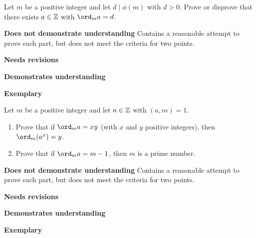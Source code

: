 \documentclass[letterpaper, 11pt]{../ximera}
\begin{document}
\begin{ex}
	Let $m$ be a positive integer and let $d\mid \phi(m)$ with $d>0$. Prove or disprove that there exists $a\in\mathbb Z$ with $\ord_m a=d$.
\end{ex}

\begin{writeRubric}
    \item \textbf{Does not demonstrate understanding}
     Contains a reasonable attempt to prove each part, but does not meet the criteria for two points.
    \item \textbf{Needs revisions}
     
    \item \textbf{Demonstrates understanding}
    
    \item \textbf{Exemplary}
        
\end{writeRubric}
                                       	
\begin{solution}
 
\end{solution}

\begin{ex} Let $m$ be a positive integer and let $a\in\mathbb Z$ with $(a,m)=1$.
	\begin{enumerate}[label=(\alph*)]
 		\item Prove that if $\ord_m a= xy$ (with $x$ and $y$ positive integers), then $\ord_m(a^x)=y$.
		\item Prove that if $\ord_m a =m-1$, then $m$ is a prime number.
	\end{enumerate}
\end{ex}

\begin{writeRubric}
    \item \textbf{Does not demonstrate understanding}
     Contains a reasonable attempt to prove each part, but does not meet the criteria for two points.
    \item \textbf{Needs revisions}
     
    \item \textbf{Demonstrates understanding}
    
    \item \textbf{Exemplary}
        
\end{writeRubric}
                                       	
\end{document}
